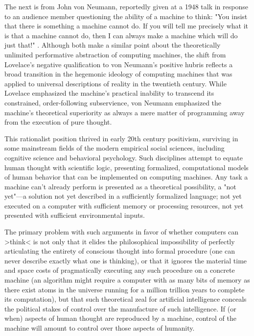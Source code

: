 {} The next is from John von Neumann, reportedly given at a 1948 talk in response to an audience member questioning the ability of a machine to think: "You insist that there is something a machine cannot do. If you will tell me precisely what it is that a machine cannot do, then I can always make a machine which will do just that!" \autocite[qtd. in][7]{Jaynes2003-wa}. Although both make a similar point about the theoretically unlimited performative abstraction of computing machines, the shift from Lovelace's negative qualification to von Neumann's positive hubris reflects a broad transition in the hegemonic ideology of computing machines that was applied to universal descriptions of reality in the twentieth century. While Lovelace emphasized the machine's practical inability to transcend its constrained, order-following subservience, von Neumann emphasized the machine's theoretical superiority as always a mere matter of programming away from the execution of pure thought.

This rationalist position thrived in early 20th century positivism, surviving in some mainstream fields of the modern empirical social sciences, including cognitive science and behavioral psychology. Such disciplines attempt to equate human thought with scientific logic, presenting formalized, computational models of human behavior that can be implemented on computing machines. Any task a machine can't already perform is presented as a theoretical possibility, a "not yet"---a solution not yet described in a sufficiently formalized language; not yet executed on a computer with sufficient memory or processing resources, not yet presented with sufficient environmental inputs.

The primary problem with such arguments in favor of whether computers can >think< is not only that it elides the philosophical impossibility of perfectly articulating the entirety of conscious thought into formal procedure (one can never describe exactly what one is thinking), or that it ignores the material time and space costs of pragmatically executing any such procedure on a concrete machine (an algorithm might require a computer with as many bits of memory as there exist atoms in the universe running for a million trillion years to complete its computation), but that such theoretical zeal for artificial intelligence conceals the political stakes of control over the manufacture of such intelligence. If (or when) aspects of human thought are reproduced by a machine, control of the machine will amount to control over those aspects of humanity.

